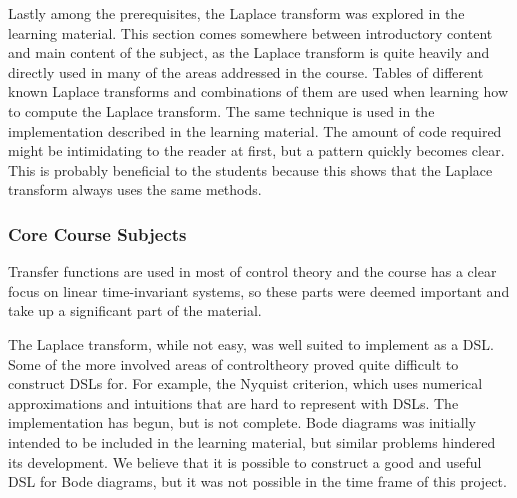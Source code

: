 Lastly among the prerequisites, the Laplace transform was explored in the learning material. This section comes somewhere between introductory content and main content of the subject, as the Laplace transform is quite heavily and directly used in many of the areas addressed in the course. Tables of different known Laplace transforms and combinations of them are used when learning how to compute the Laplace transform. The same technique is used in the implementation described in the learning material.
The amount of code required might be intimidating to the reader at first, but a pattern quickly becomes clear. 
This is probably beneficial to the students because this shows that the Laplace transform always uses the same methods.



\subsubsection{Core Course Subjects}
\iffalse
\todo[inline,color=other]{Write about the more central parts included, and if we should've included more.\\
*Tillståndsmodeller,\\
*Pid-regulatorer,\\
*Problematik med nyqvist,\\
*Bode diagram,\\
*Stabilitet och andra metoder för att kontrollera detta,\\
*Linjärisering,\\
*De vi skrivt om: LTI, TF
}
\fi


Transfer functions are used in most of control theory and the course has a clear focus on linear time-invariant systems, so these parts were deemed important and take up a significant part of the material. 

The Laplace transform, while not easy, was well suited to implement as a DSL. 
Some of the more involved areas of \gls{controltheory} proved quite difficult to construct \gls{DSL}s for. For example, the Nyquist criterion, which uses numerical approximations and intuitions that are hard to represent with \gls{DSL}s.
The implementation has begun, but is not complete.
Bode diagrams was initially intended to be included in the learning material, but similar problems hindered its development. 
We believe that it is possible to construct a good and useful DSL for Bode diagrams, but it was not possible in the time frame of this project.

